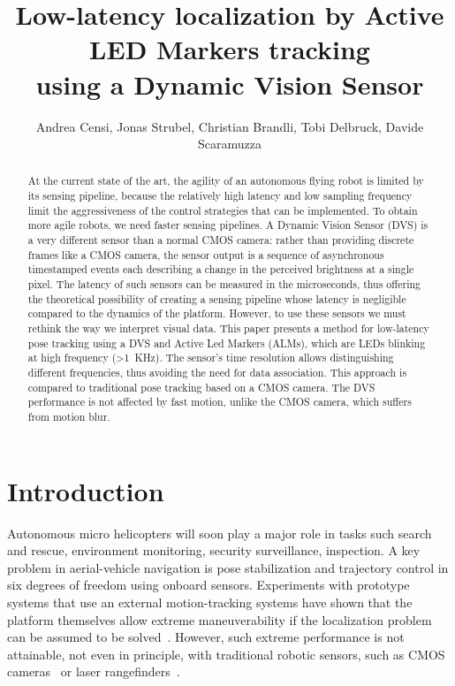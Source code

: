 
\title{\LARGE\bf Low-latency localization by Active LED Markers tracking
\\
using a Dynamic Vision Sensor}


\author{Andrea Censi\mythanks, Jonas Strubel, Christian Brandli, Tobi Delbruck,
Davide Scaramuzza}
\maketitle
\begin{abstract}
At the current state of the art, the agility of an autonomous flying
robot is limited by its sensing pipeline, because the relatively high
latency and low sampling frequency limit the aggressiveness of the
control strategies that can be implemented. To obtain more agile robots,
we need faster sensing pipelines. A Dynamic Vision Sensor (DVS) is
a very different sensor than a normal CMOS camera: rather than providing
discrete frames like a CMOS camera, the sensor output is a sequence
of asynchronous timestamped events each describing a change in the
perceived brightness at a single pixel. The latency of such sensors
can be measured in the microseconds, thus offering the theoretical
possibility of creating a sensing pipeline whose latency is negligible
compared to the dynamics of the platform. However, to use these sensors
we must rethink the way we interpret visual data. This paper presents
a method for low-latency pose tracking using a DVS and Active Led
Markers (ALMs), which are LEDs blinking at high frequency (>1~KHz).
The sensor's time resolution allows distinguishing different frequencies,
thus avoiding the need for data association. This approach is compared
to traditional pose tracking based on a CMOS camera. The DVS performance
is not affected by fast motion, unlike the CMOS camera, which suffers
from motion blur. 
\end{abstract}

\section{Introduction}

Autonomous micro helicopters will soon play a major role in tasks
such search and rescue, environment monitoring, security surveillance,
inspection. A key problem in aerial-vehicle navigation is pose stabilization
and trajectory control in six degrees of freedom using onboard sensors.
Experiments with prototype systems that use an external motion-tracking
systems have shown that the platform themselves allow extreme maneuverability
if the localization problem can be assumed to be solved~\cite{Lupashin2012}.
However, such extreme performance is not attainable, not even in principle,
with traditional robotic sensors, such as CMOS cameras~\cite{Weiss2011}
or laser rangefinders~\cite{Shen2011}.

